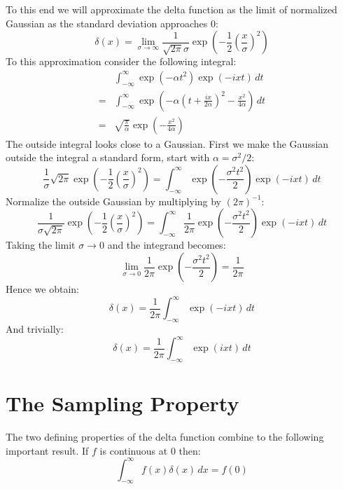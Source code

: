 \documentclass[12pt]{report}
\begin{document}
To this end we will approximate the delta function as the limit of normalized Gaussian as the standard deviation approaches $0$:
\[\delta(x) = \lim_{\sigma\rightarrow\infty}\frac{1}{\sqrt{2\pi}\sigma}\exp\left(-\frac{1}{2}\left(\frac{x}{\sigma}\right)^2\right)\]
To this approximation consider the following integral:
\begin{equation*}
\begin{aligned}
	&\int_{-\infty}^{\infty}\exp(-\alpha t^2) \exp(-ixt)\,dt \\
	=&\int_{-\infty}^{\infty}\exp\left(-\alpha\left(t+\frac{ix}{2\alpha}\right)^2-\frac{x^2}{4\alpha}\right)\,dt\\
	=& \sqrt{\frac{\pi}{\alpha}}\exp\left(-\frac{x^2}{4\alpha}\right)
\end{aligned}
\end{equation*}
The outside integral looks close to a Gaussian.
First we make the Gaussian outside the integral a standard form, start with $\alpha = \sigma^2/2$:
\[\frac{1}{\sigma}\sqrt{2\pi}\exp\left(-\frac{1}{2}\left(\frac{x}{\sigma}\right)^2\right) = \int_{-\infty}^{\infty}\exp\left(-\frac{\sigma^2t^2}{2}\right)\exp(-ixt)\,dt\]
Normalize the outside Gaussian by multiplying by $(2\pi)^{-1}$:
\[\frac{1}{\sigma\sqrt{2\pi}}\exp\left(-\frac{1}{2}\left(\frac{x}{\sigma}\right)^2\right) = \int_{-\infty}^{\infty}\frac{1}{2\pi }\exp\left(-\frac{\sigma^2t^2}{2}\right)\exp(-ixt)\,dt\]
Taking the limit $\sigma \rightarrow 0$ and the integrand becomes:
\[\lim_{\sigma \rightarrow 0}\frac{1}{2\pi }\exp\left(-\frac{\sigma^2t^2}{2}\right)  = \frac{1}{2\pi} \]
Hence we obtain:
\[\delta(x) = \frac{1}{2\pi} \int_{-\infty}^{\infty}\exp(-ixt)\,dt\]
And trivially:
\[\delta(x) = \frac{1}{2\pi} \int_{-\infty}^{\infty}\exp(ixt)\,dt\]

\section{The Sampling Property}
The two defining properties of the delta function combine to the following important result.
If $f$ is continuous at $0$ then:
\[\int_{-\infty}^{\infty}f(x)\delta(x)\,dx = f(0)\]
\end{document}

